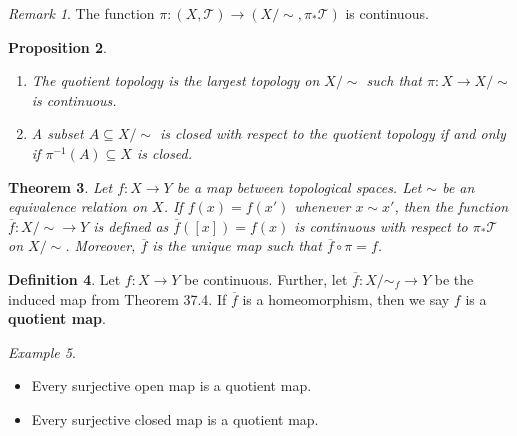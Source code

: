 \documentclass[ 12pt ]{article}
\newcounter{lecture_num}
\theoremstyle{plain}
\theoremstyle{plain}
\newtheorem{theorem}{Theorem}[lecture_num]
\newtheorem{proposition}[theorem]{Proposition}
\theoremstyle{definition}
\newtheorem{definition}[theorem]{Definition}
\theoremstyle{remark}
\newtheorem{remark}[theorem]{Remark}
\newtheorem{example}[theorem]{Example}
\begin{document}
\begin{remark}
	The function $\pi : (X, \mathcal{T}) \to (X/\sim, \pi_* \mathcal{T})$ is continuous.
\end{remark}

\begin{proposition} $ $
	\begin{enumerate}
		\item The quotient topology is the \textit{largest} topology on $X/\sim$ such that $\pi : X \to X/\sim$ is continuous.
		\item A subset $A \subseteq X/\sim$ is closed with respect to the quotient topology if and only if $\pi^{-1}(A) \subseteq X$ is closed.
	\end{enumerate}
\end{proposition}

\begin{theorem}
	Let $f : X \to Y$ be a map between topological spaces. Let $\sim$ be an equivalence relation on $X$. If $f(x) = f(x')$ whenever $x \sim x'$, then the function $\overline{f} : X/\sim
	\to Y$ is defined as $\overline{f}([x]) = f(x)$ is continuous with respect to $\pi_*\mathcal{T}$ on $X/\sim$. Moreover, $\overline{f}$ is the unique map such that $\overline{f} \circ
	\pi = f$.
\end{theorem}

\begin{definition}
	Let $f : X \to Y$ be continuous. Further, let $\overline{f} : X/\sim_f \to Y$ be the induced map from Theorem 37.4. If $\overline{f}$ is a homeomorphism, then we say $f$ is a
	\textbf{quotient map}.
\end{definition}

\begin{example} $ $
	\begin{itemize}
		\item Every surjective open map is a quotient map.
		\item Every surjective closed map is a quotient map.
	\end{itemize}
\end{example}
\end{document}
